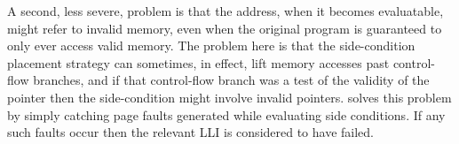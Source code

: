 A second, less severe, problem is that the address, when it becomes
evaluatable, might refer to invalid memory, even when the original
program is guaranteed to only ever access valid memory.  The problem
here is that the side-condition placement strategy can sometimes, in
effect, lift memory accesses past control-flow branches, and if that
control-flow branch was a test of the validity of the pointer then the
side-condition might involve invalid pointers.  {\Implementation}
solves this problem by simply catching page faults generated while
evaluating side conditions.  If any such faults occur then the
relevant LLI is considered to have failed.

